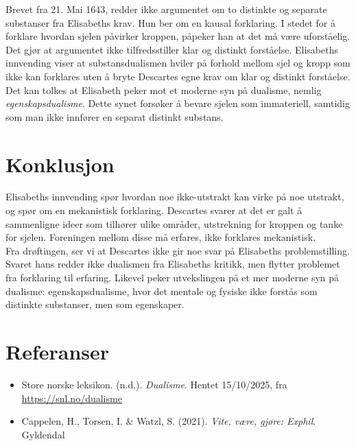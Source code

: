 \documentclass[12pt, a4paper]{article}
\begin{document}
Brevet fra 21. Mai 1643, redder ikke argumentet om to distinkte og separate substanser fra Elisabeths krav. Hun ber om en kausal forklaring. I stedet for å forklare hvordan sjelen påvirker kroppen, påpeker han at det må være uforståelig. Det gjør at argumentet ikke tilfredsstiller klar og distinkt forståelse. Elisabeths innvending viser at substansdualismen hviler på forhold mellom sjel og kropp som ikke kan forklares uten å bryte Descartes egne krav om klar og distinkt forståelse. \\

Det kan tolkes at Elisabeth peker mot et moderne syn på dualisme, nemlig \textit{egenskapsdualisme}. Dette synet forsøker å bevare sjelen som immateriell, samtidig som man ikke innfører en separat distinkt substans. 
\section{Konklusjon}

Elisabeths innvending spør hvordan noe ikke-utstrakt kan virke på noe utstrakt, og spør om en mekanistisk forklaring. Descartes svarer at det er galt å sammenligne ideer som tilhører ulike områder, utstrekning for kroppen og tanke for sjelen. Foreningen mellom disse må erfares, ikke forklares mekanistisk. \\

Fra drøftingen, ser vi at Descartes ikke gir noe svar på Elisabeths problemstilling. Svaret hans redder ikke dualismen fra Elisabeths kritikk, men flytter problemet fra forklaring til erfaring. Likevel peker utvekslingen på et mer moderne syn på dualisme: egenskapsdualisme, hvor det mentale og fysiske ikke forstås som distinkte substanser, men som egenskaper.

\section{Referanser}


\begin{itemize}
    \item Store norske leksikon. (n.d.). \textit{Dualisme}. Hentet 15/10/2025, fra \url{https://snl.no/dualisme}
    \item Cappelen, H., Torsen, I. \& Watzl, S. (2021). \textit{Vite, være, gjøre: Exphil}. Gyldendal
\end{itemize}
\end{document}
